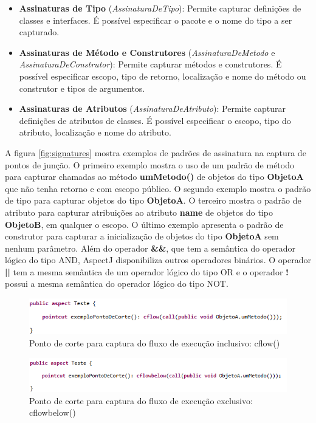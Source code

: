 \begin{itemize}
  \item \textbf{Assinaturas de Tipo} (\textit{AssinaturaDeTipo}): Permite
  capturar definições de classes e interfaces. É possível especificar o pacote e o nome
  do tipo a ser capturado.
  \item \textbf{Assinaturas de Método e Construtores}
  (\textit{AssinaturaDeMetodo} e \textit{AssinaturaDeConstrutor}): Permite
  capturar métodos e construtores. É possível especificar escopo, tipo de retorno, localização e nome do método
  ou construtor e tipos de argumentos.
  \item \textbf{Assinaturas de Atributos} (\textit{AssinaturaDeAtributo}):
  Permite capturar definições de atributos de classes. É possível especificar o escopo, tipo do
  atributo, localização e nome do atributo.
\end{itemize}

A figura \ref{fig:signatures} mostra exemplos de padrões de assinatura na captura de pontos de junção. O primeiro exemplo mostra o uso de um padrão de
método para capturar chamadas ao método \textbf{umMetodo()} de objetos do tipo \textbf{ObjetoA} que não tenha retorno e com escopo público. O segundo
exemplo mostra o padrão de tipo para capturar objetos do tipo \textbf{ObjetoA}. O terceiro mostra o padrão de atributo para capturar atribuições ao
atributo \textbf{name} de objetos do tipo \textbf{ObjetoB}, em qualquer o escopo. O último exemplo apresenta o padrão de construtor para capturar a
inicialização de objetos do tipo \textbf{ObjetoA} sem nenhum parâmetro. Além do operador \textbf{\&\&}, que tem a semântica do operador lógico do tipo
AND, AspectJ disponibiliza outros operadores binários. O operador \textbf{||} tem a mesma semântica de um operador lógico do tipo OR e o operador
\textbf{!} possui a mesma semântica do operador lógico do tipo NOT.

\begin{figure}[!hb]
	\centering
	\includegraphics{img/flow_p1.png}
	\caption{Ponto de corte para captura do fluxo de execução inclusivo: cflow()}\label{fig:flow_p1}
\end{figure}

\begin{figure}[!hb]
	\centering
	\includegraphics{img/flow_p2.png}
	\caption{Ponto de corte para captura do fluxo de execução exclusivo: cflowbelow()}\label{fig:flow_p2}
\end{figure}
 
